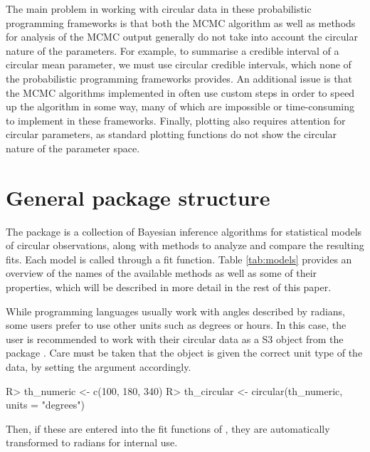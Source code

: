 The main problem in working with circular data in these probabilistic
programming frameworks is that both the MCMC algorithm as well as
methods for analysis of the MCMC output generally do not take into
account the circular nature of the parameters. For example, to summarise
a credible interval of a circular mean parameter, we must use circular
credible intervals, which none of the probabilistic programming
frameworks provides. An additional issue is that the MCMC algorithms
implemented in  often use custom steps in order to speed
up the algorithm in some way, many of which are impossible or
time-consuming to implement in these frameworks. Finally, plotting also
requires attention for circular parameters, as standard plotting
functions do not show the circular nature of the parameter space.

\hypertarget{general-package-structure}{%
\section{General package structure}\label{general-package-structure}}

\label{sec:pkgstruct}

The package  is a collection of Bayesian inference
algorithms for statistical models of circular observations, along with
methods to analyze and compare the resulting fits. Each model is called
through a fit function. Table \ref{tab:models} provides an overview of
the names of the available methods as well as some of their properties,
which will be described in more detail in the rest of this paper.

While programming languages usually work with angles described by
radians, some users prefer to use other units such as degrees or hours.
In this case, the user is recommended to work with their circular data
as a  S3 object from the package . Care
must be taken that the  object is given the correct unit
type of the data, by setting the  argument accordingly.

\begin{CodeChunk}

\begin{CodeInput}
R> th_numeric  <- c(100, 180, 340)
R> th_circular <- circular(th_numeric, units = "degrees")
\end{CodeInput}
\end{CodeChunk}

Then, if these are entered into the fit functions of ,
they are automatically transformed to radians for internal use.

